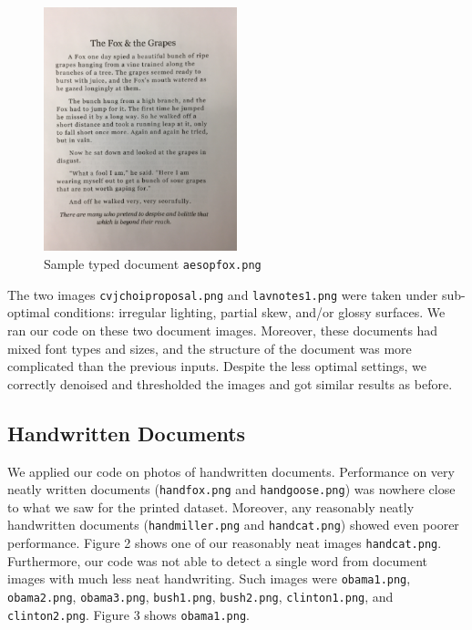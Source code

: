 \documentclass[11pt,letterpaper]{article}
\begin{document}
\begin{figure}[t!]
  \centering
  \includegraphics[keepaspectratio, width=0.5\textwidth]{fox.png}
  \caption{Sample typed document {\tt aesop\textunderscore fox.png}}
\end{figure}

The two images {\tt cv\textunderscore jchoi\textunderscore proposal.png} and {\tt lav\textunderscore notes1.png} were taken under sub-optimal conditions: irregular lighting, partial skew, and/or glossy surfaces. We ran our code on these two document images. Moreover, these documents had mixed font types and sizes, and the structure of the document was more complicated than the previous inputs. Despite the less optimal settings, we correctly denoised and thresholded the images and got similar results as before.

\subsection{Handwritten Documents}

We applied our code on photos of handwritten documents. Performance on very neatly written documents ({\tt hand\textunderscore fox.png} and {\tt hand\textunderscore goose.png}) was nowhere close to what we saw for the printed dataset. Moreover, any reasonably neatly handwritten documents ({\tt hand\textunderscore miller.png} and {\tt hand\textunderscore cat.png}) showed even poorer performance. Figure 2 shows one of our reasonably neat images {\tt hand\textunderscore cat.png}. Furthermore, our code was not able to detect a single word from document images with much less neat handwriting. Such images were {\tt obama1.png}, {\tt obama2.png}, {\tt obama3.png}, {\tt bush1.png}, {\tt bush2.png}, {\tt clinton1.png}, and {\tt clinton2.png}. Figure 3 shows {\tt obama1.png}.
\end{document}
